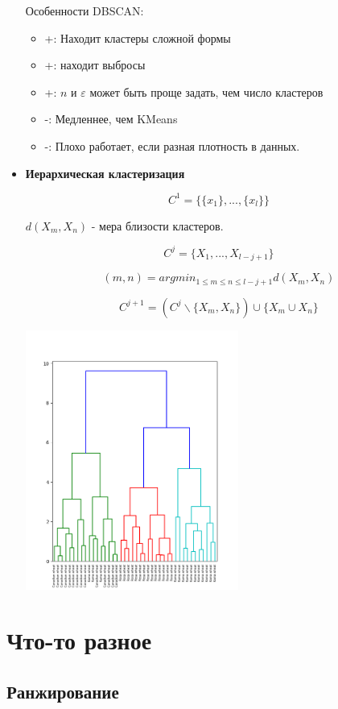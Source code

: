 \documentclass[a4paper]{article}
\begin{document}
\begin{itemize}
Особенности DBSCAN:
\begin{itemize}
\item +: Находит кластеры сложной формы
\item +: находит выбросы
\item +: $n$ и $\varepsilon$ может быть проще задать, чем число кластеров
\item -: Медленнее, чем KMeans
\item -: Плохо работает, если разная плотность в данных.
\end{itemize}

\item \textbf{Иерархическая кластеризация}

\[ C^1 = \{ \{ x_1 \}, ..., \{ x_l \} \} \]

$d(X_m, X_n)$ - мера близости кластеров.

\[ C^j = \{ X_1,  ..., X_{l-j+1} \} \]

\[ (m, n) = argmin_{1 \leq m \leq n \leq l-j+1} d(X_m, X_n) \]

\[ C^{j+1} = \left( C^j \backslash \{ X_m, X_n \} \right) \cup \{ X_m \cup X_n \} \]

\includegraphics[width=7cm]{clasterization.png}
\end{itemize}

\section*{Что-то разное}

\subsection*{Ранжирование}
\end{document}
